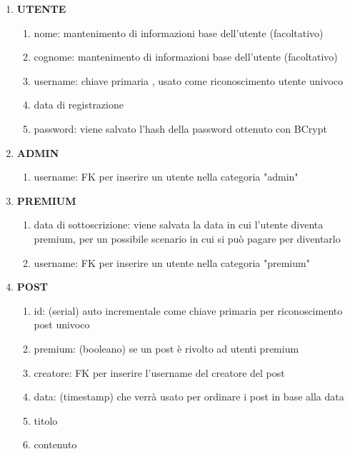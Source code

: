 \documentclass{article} %
\begin{document}
    \begin{enumerate}[label*={\arabic*.}]
        \item \textbf{UTENTE}
            \begin{enumerate}[label*={\arabic*.}]
                \item nome: mantenimento di informazioni base dell'utente (facoltativo)
                \item cognome: mantenimento di informazioni base dell'utente (facoltativo)
                \item username: chiave primaria , usato come riconoscimento utente univoco
                \item data di registrazione
                \item password: viene salvato l'hash della password ottenuto con BCrypt
            \end{enumerate}
        \item \textbf{ADMIN}
            \begin{enumerate}[label*={\arabic*.}]
                \item username: FK per inserire un utente nella categoria "admin" 
            \end{enumerate}
        \item \textbf{PREMIUM}
            \begin{enumerate}[label*={\arabic*.}]
                \item data di sottoscrizione: viene salvata la data in cui l'utente diventa premium, per un possibile scenario in cui si può pagare per diventarlo
                \item username: FK per inserire un utente nella categoria "premium" 
            \end{enumerate}
        \item \textbf{POST}
            \begin{enumerate}[label*={\arabic*.}]
                \item id: (serial) auto incrementale come chiave primaria per riconoscimento post univoco
                \item premium: (booleano) se un post è rivolto ad utenti premium
                \item creatore: FK per inserire l'username del creatore del post
                \item data: (timestamp) che verrà usato per ordinare i post in base alla data
                \item titolo
                \item contenuto

\end{enumerate}
\end{enumerate}
\end{document}
